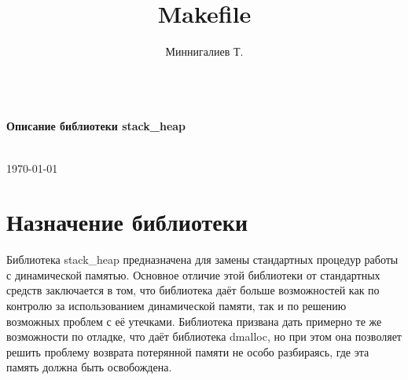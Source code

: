 \documentclass{article}
\begin{document}
\author{Миннигалиев Т.}
\title{Makefile}


\begin{titlepage}
\begin{center}


\vspace*{7cm} %
\hrulefill \\[1.0cm]

{ \Large \bfseries Описание библиотеки stack\_heap}\\[0.8cm]

\hrulefill \\[1.5cm]



\vfill

{\large \today}

\end{center}

\end{titlepage}
\newpage
\tableofcontents

\newpage
\section{Назначение библиотеки}
Библиотека stack\_heap предназначена для замены стандартных процедур работы с динамической памятью. Основное отличие этой библиотеки от стандартных средств заключается в том, что библиотека даёт больше возможностей как по контролю за использованием динамической памяти, так и по решению возможных проблем с её утечками.
Библиотека призвана дать примерно те же возможности по отладке, что даёт библиотека dmalloc, но при этом она позволяет решить проблему возврата потерянной памяти не особо разбираясь, где эта память должна быть освобождена.
\end{document}
